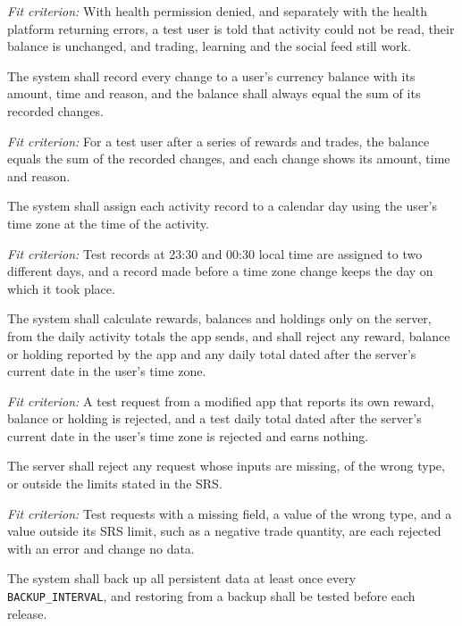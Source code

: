 \documentclass[12pt]{article}
\begin{document}
\begin{description}
\textit{Fit criterion:} With health permission denied, and separately with the
health platform returning errors, a test user is told that activity could not
be read, their balance is unchanged, and trading, learning and the social feed
still work.

\item[SEC-22 (Balance history).] The system shall record every change to a user's currency balance with its
amount, time and reason, and the balance shall always equal the sum of its
recorded changes.

\textit{Fit criterion:} For a test user after a series of rewards and trades,
the balance equals the sum of the recorded changes, and each change shows its
amount, time and reason.

\item[SEC-23 (Count activity on the user's day).] The system shall assign each activity record to a calendar day using the
user's time zone at the time of the activity.

\textit{Fit criterion:} Test records at 23:30 and 00:30 local time are
assigned to two different days, and a record made before a time zone change
keeps the day on which it took place.

\item[SEC-24 (The server decides rewards and balances).] The system shall calculate rewards, balances and holdings only on the server,
from the daily activity totals the app sends, and shall reject any reward,
balance or holding reported by the app and any daily total dated after
the server's current date in the user's time zone.

\textit{Fit criterion:} A test request from a modified app that reports its
own reward, balance or holding is rejected, and a test daily total dated after
the server's current date in the user's time zone is rejected and earns nothing.

\item[SEC-25 (Validate every request).] The server shall reject any request whose inputs are missing, of the wrong
type, or outside the limits stated in the SRS.

\textit{Fit criterion:} Test requests with a missing field, a value of the
wrong type, and a value outside its SRS limit, such as a negative trade
quantity, are each rejected with an error and change no data.

\item[SEC-26 (Backups).] The system shall back up all persistent data at least once every
\texttt{BACKUP\_INTERVAL}, and restoring from a backup shall be tested before
each release.


\end{description}
\end{document}
